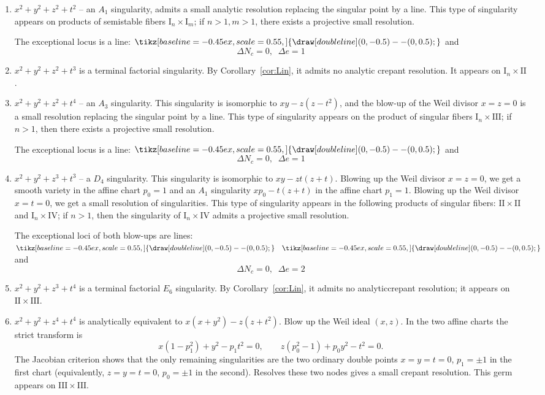 \documentclass[a4paper]{amsart}
\theoremstyle{plain}
\theoremstyle{definition}
\theoremstyle{remark}
\numberwithin{equation}{section}
\newcommand{\fibericon}[2][]{%
  \tikz[baseline=-0.45ex,scale=0.55,#1]{#2}%
}
\newcommand{\DoublePone}{%
  \fibericon{ \draw[doubleline] (0,-0.5) -- (0,0.5); }%
}
\begin{document}
\begin{enumerate}[itemsep=2mm plus 2mm]
\item $x^2 + y^2 + z^2 + t^2$ -- an $A_{1}$ singularity, admits a small analytic resolution replacing the singular point by a line. This type of singularity appears on products of semistable fibers $\mathrm{I}_{n}\times \mathrm{I}_{m}$; if $n>1, m>1$, there exists a projective small resolution.

The exceptional locus is a line: $\DoublePone$ and
\[
\Delta N_{c}=0,\;\; \Delta e=1
\]
\item $x^2 + y^2 + z^2 + t^3$ is a terminal factorial singularity.
By Corollary~\ref{cor:Lin}, it admits no analytic crepant resolution.  It
appears on $\mathrm{I}_n\times\mathrm{II}$.

\item $x^2 + y^2 + z^2 + t^4$ -- an $A_{3}$ singularity. This singularity is isomorphic to $xy- z(z-t^{2})$, and the blow-up of the Weil divisor $x=z=0$ is a small resolution replacing the singular point by a line.
This type of singularity appears on the product of singular fibers $\mathrm{I}_{n}\times \mathrm{III}$; if $n>1$, then there exists a projective small resolution.

The exceptional locus is a line: $\DoublePone$ and
\[
\Delta N_{c}=0,\;\; \Delta e=1
\]
\item $x^2 + y^2 + z^3 + t^3$ -- a $D_{4}$ singularity. This singularity is isomorphic to $xy-zt(z+t)$. Blowing up the Weil divisor $x=z=0$, we get a smooth variety in the affine chart $p_{0}=1$ and an $A_{1}$ singularity $xp_{0}-t(z+t)$ in the affine chart $p_{1}=1$. Blowing up the Weil divisor $x=t=0$, we get a small resolution of singularities. This type of singularity appears in the following products of singular fibers: $\mathrm{II}\times \mathrm{II}$ and $\mathrm{I}_{n}\times \mathrm{IV}$; if $n>1$, then the singularity of $\mathrm{I}_{n}\times \mathrm{IV}$ admits a projective small resolution.

The exceptional loci of both blow-ups are lines: $\DoublePone\quad\DoublePone$ and
\[
\Delta N_{c}=0,\;\; \Delta e=2
\]
\item $x^2 + y^2 + z^3 + t^4$ is a terminal factorial $E_6$ singularity.
By Corollary~\ref{cor:Lin}, it admits no analyticcrepant resolution; it
appears on $\mathrm{II}\times\mathrm{III}$.

\item $x^2+y^2+z^4+t^4$ is analytically equivalent to
$x(x+y^2)-z(z+t^2)$.  Blow up the Weil ideal $(x,z)$.  In the two affine
charts the strict transform is
\[
x(1-p_1^2)+y^2-p_1t^2=0,
\qquad
z(p_0^2-1)+p_0y^2-t^2=0.
\]
The Jacobian criterion shows that the only remaining singularities are the
two ordinary double points $x=y=t=0$, $p_1=\pm1$ in the first chart
(equivalently, $z=y=t=0$, $p_0=\pm1$ in the second).
Resolves these two
nodes gives a small crepant resolution.  This germ appears on
$\mathrm{III}\times\mathrm{III}$.


\end{enumerate}
\end{document}
